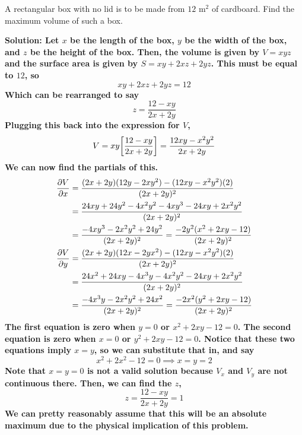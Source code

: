 \begin{example}
    A rectangular box with no lid is to be made from \(12\) \( \unit{\meter^2}\) of cardboard. Find the maximum volume of such a box.
    \par\bf{Solution: }
    Let \(x\) be the length of the box, \(y\) be the width of the box, and \(z\) be the height of the box. Then, the volume is given by \(V=xyz\) and the surface area is given by \(S = xy+2xz+2yz\). This must be equal to \(12\), so
    \[ xy+2xz+2yz = 12\]
    Which can be rearranged to say
    \[ z = \frac{12-xy}{2x+2y}\]
    Plugging this back into the expression for \(V\),
    \[ V = xy\bqty{\frac{12-xy}{2x+2y}} = \frac{12xy-x^2y^2}{2x+2y}\]
    We can now find the partials of this. 
    \begin{align*}
        \pdv{V}{x} &= \frac{(2x+2y)(12y-2xy^2)-(12xy-x^2y^2)(2)}{(2x+2y)^2}\\& = \frac{24xy+24y^2-4x^2y^2-4xy^3-24xy+2x^2y^2}{(2x+2y)^2} \\
        &= \frac{-4xy^3-2x^2y^2+24y^2}{(2x+2y)^2} = \frac{-2y^2(x^2+2xy-12)}{(2x+2y)^2} \\
        \pdv{V}{y} &= \frac{(2x+2y)(12x-2yx^2)-(12xy-x^2y^2)(2)}{(2x+2y)^2} \\
        &= \frac{24x^2+24xy-4x^3y-4x^2y^2-24xy+2x^2y^2}{(2x+2y)^2} \\
        &= \frac{-4x^3y - 2x^2y^2 + 24x^2 }{(2x+2y)^2} = \frac{-2x^2(y^2+2xy-12)}{(2x+2y)^2}
    \end{align*}
    The first equation is zero when \(y=0\) or \(x^2+2xy-12=0\). The second equation is zero when \(x=0\) or \(y^2+2xy-12=0\). Notice that these two equations imply \(x=y\), so we can substitute that in, and say
    \[ x^2+2x^2-12=0 \implies x=y=2\]
    Note that \(x=y=0\) is not a valid solution because \(V_x\) and \(V_y\) are not continuous there. Then, we can find the \(z\),
    \[ z=\frac{12-xy}{2x+2y} = 1 \]
    We can pretty reasonably assume that this will be an absolute maximum due to the physical implication of this problem.
\end{example}

